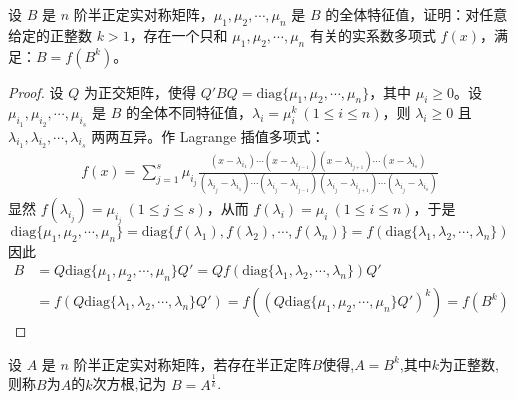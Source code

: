 \documentclass[../../main.tex]{subfiles}%
\begin{document}
\begin{proposition}\label{proposition:例9.60}
设 \(B\) 是 \(n\) 阶半正定实对称矩阵，\(\mu_1,\mu_2,\cdots,\mu_n\) 是 \(B\) 的全体特征值，证明：对任意给定的正整数 \(k > 1\)，存在一个只和 \(\mu_1,\mu_2,\cdots,\mu_n\) 有关的实系数多项式 \(f(x)\)，满足：\(B = f(B^k)\)。
\end{proposition}
\begin{proof}

设 \(Q\) 为正交矩阵，使得 \(Q'BQ = \mathrm{diag}\{\mu_1,\mu_2,\cdots,\mu_n\}\)，其中 \(\mu_i \geqslant  0\)。设 \(\mu_{i_1},\mu_{i_2},\cdots,\mu_{i_s}\) 是 \(B\) 的全体不同特征值，\(\lambda_i = \mu_i^k\ (1\leqslant  i \leqslant  n)\)，则 \(\lambda_i \geqslant  0\) 且 \(\lambda_{i_1},\lambda_{i_2},\cdots,\lambda_{i_s}\) 两两互异。作 Lagrange 插值多项式：
\begin{align*}
f(x) = \sum_{j = 1}^{s}\mu_{i_j}\frac{(x - \lambda_{i_1})\cdots(x - \lambda_{i_{j - 1}})(x - \lambda_{i_{j + 1}})\cdots(x - \lambda_{i_s})}{(\lambda_{i_j} - \lambda_{i_1})\cdots(\lambda_{i_j} - \lambda_{i_{j - 1}})(\lambda_{i_j} - \lambda_{i_{j + 1}})\cdots(\lambda_{i_j} - \lambda_{i_s})}
\end{align*}
显然 \(f(\lambda_{i_j}) = \mu_{i_j}\ (1\leqslant  j \leqslant  s)\)，从而 \(f(\lambda_i) = \mu_i\ (1\leqslant  i \leqslant  n)\)，于是
\[
\mathrm{diag}\{\mu_1,\mu_2,\cdots,\mu_n\} = \mathrm{diag}\{f(\lambda_1),f(\lambda_2),\cdots,f(\lambda_n)\} = f(\mathrm{diag}\{\lambda_1,\lambda_2,\cdots,\lambda_n\})
\]
因此
\begin{align*}
B &= Q\mathrm{diag}\{\mu_1,\mu_2,\cdots,\mu_n\}Q' = Qf(\mathrm{diag}\{\lambda_1,\lambda_2,\cdots,\lambda_n\})Q'\\
&= f(Q\mathrm{diag}\{\lambda_1,\lambda_2,\cdots,\lambda_n\}Q') = f((Q\mathrm{diag}\{\mu_1,\mu_2,\cdots,\mu_n\}Q')^k) = f(B^k)
\end{align*} 

\end{proof}

\begin{definition}
设 \(A\) 是 \(n\) 阶半正定实对称矩阵，若存在半正定阵$B$使得,$A=B^k$,其中$k$为正整数,则称$B$为$A$的$k$次方根,记为 \(B = A^{\frac{1}{k}}\).
\end{definition}
\end{document}
